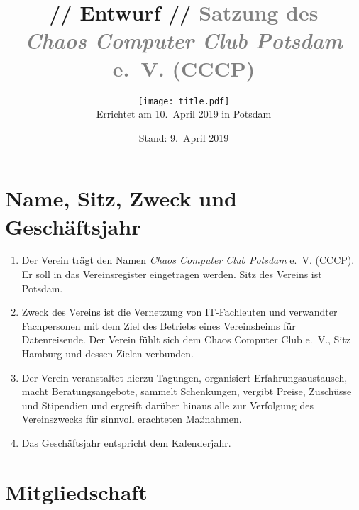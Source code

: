 \documentclass[a4paper, 10pt, headings=normal]{scrartcl}
\title{\textcolor{alert}{// Entwurf //} \textcolor{gray}{Satzung des \\ \emph{Chaos Computer Club Potsdam} e.~V. (CCCP)}}
\author{\texttt{[image: title.pdf]} \\[10pt] Errichtet am 10.~April 2019 in Potsdam}
\date{Stand: 9.~April 2019}
\begin{document}
\maketitle
\pagestyle{myheadings}

\begin{multicols}{2}

\section{Name, Sitz, Zweck und Geschäftsjahr}
\label{par:name-sitz-zweck}

\begin{enumerate}[label={(\arabic*)}]
	\item
		Der Verein trägt den Namen \emph{Chaos Computer Club Potsdam} e.~V. (CCCP).
		Er soll in das Vereinsregister eingetragen werden.
		Sitz des Vereins ist Potsdam.
	\item
		Zweck des Vereins ist die Vernetzung von IT-Fachleuten und verwandter Fachpersonen mit dem Ziel des Betriebs eines Vereinsheims für Datenreisende.
		Der Verein fühlt sich dem Chaos Computer Club e.~V., Sitz Hamburg und dessen Zielen verbunden.
	\item
		Der Verein veranstaltet hierzu Tagungen, organisiert Erfahrungsaustausch, macht Beratungsangebote, sammelt Schenkungen, vergibt Preise, Zuschüsse und Stipendien und ergreift darüber hinaus alle zur Verfolgung des Vereinszwecks für sinnvoll erachteten Maßnahmen.
	\item
		Das Geschäftsjahr entspricht dem Kalenderjahr.
\end{enumerate}

\section{Mitgliedschaft}
\label{par:mitgliedschaft}


\end{multicols}
\end{document}
